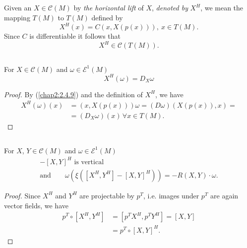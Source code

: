 \setcounter{subsection}{7}
\subsection{}\label{chap2:2.5.8}

\begin{defi*}
Given an $X\in \mathscr{C}(M)$ by {\em the horizontal lift} of $X$,
{\em denoted by} $X^{H}$, we mean the mapping $T(M)$ to $T(M)$ defined
by
$$
X^{H}(x)=C(x,X(p(x))), \ x\in T(M).
$$
Since $C$ is differentiable it follows that
$$
X^{H}\in\mathscr{C}(T(M)).
$$
\end{defi*}

\subsection{}\label{chap2:2.5.9}


\begin{lemma*}
For $X\in\mathscr{C}(M)$ and $\omega\in\mathscr{E}^1(M)$
$$
X^{H}(\omega)=D_{X}\omega
$$
\end{lemma*}

\begin{proof}
By (\ref{chap2:2.4.9}) and the definition of $X^{H}$, we have
\begin{align*}
X^{H}(\omega)(x) &= (x,X(p(x)))\omega=(D\omega)(X(p(x)),x)=\\
&= (D_{X}\omega)(x) \, \forall x\in T(M).
\end{align*}
\end{proof}

\subsection{}\label{chap2:2.5.10}

\begin{prop*}
For $X$, $Y\in\mathscr{C}(M)$ and $\omega\in \mathscr{E}^{1}(M)$
\begin{gather*}
[X^{H},Y^{H}]-[X,Y]^{H}\text{ \  is vertical}\\
\text{and}\qquad \omega(\xi([X^{H},Y^{H}]-[X,Y]^{H}))=-R(X,Y)\cdot \omega.
\end{gather*}
\end{prop*}

\begin{proof}
Since $X^{H}$ and $Y^{H}$ are projectable by $p^{T}$, i.e. images
under $p^{T}$ are again vector fields, we have
\begin{align*}
p^{T}\circ [X^{H},Y^{H}] &= [p^{T}X^{H},p^{T}Y^{H}]=[X,Y]\\
&= p^{T}\circ[X,Y]^{H}.
\end{align*}
\end{proof}

